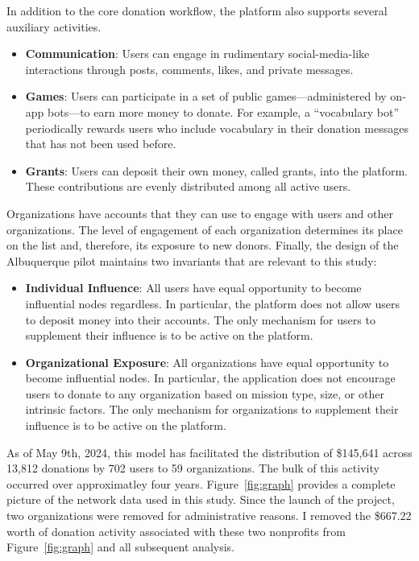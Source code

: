 In addition to the core donation workflow, the platform also supports several auxiliary activities. 

\begin{itemize}
  \item \textbf{Communication}: Users can engage in rudimentary social-media-like interactions through posts, comments, likes, and private messages.
  \item \textbf{Games}: Users can participate in a set of public games---administered by on-app bots---to earn more money to donate. For example, a ``vocabulary bot'' periodically rewards users who include vocabulary in their donation messages that has not been used before.
  \item \textbf{Grants}: Users can deposit their own money, called grants, into the platform. These contributions are evenly distributed among all active users.
\end{itemize}

Organizations have accounts that they can use to engage with users and other organizations.
The level of engagement of each organization determines its place on the list and, therefore, its exposure to new donors.
Finally, the design of the Albuquerque pilot maintains two invariants that are relevant to this study:

\begin{itemize}

  \item \textbf{Individual Influence}: All users have equal opportunity to become influential nodes regardless.
In particular, the platform does not allow users to deposit money into their accounts.
The only mechanism for users to supplement their influence is to be active on the platform.

  \item \textbf{Organizational Exposure}: All organizations have equal opportunity to become influential nodes.
In particular, the application does not encourage users to donate to any organization based on mission type, size, or other intrinsic factors.
The only mechanism for organizations to supplement their influence is to be active on the platform.

\end{itemize}

As of May 9th, 2024, this model has facilitated the distribution of \$145,641 across 13,812 donations by 702 users to 59 organizations.
The bulk of this activity occurred over approximatley four years.
Figure~\ref{fig:graph} provides a complete picture of the network data used in this study.
Since the launch of the project, two organizations were removed for administrative reasons.
I removed the \$667.22 worth of donation activity associated with these two nonprofits from Figure~\ref{fig:graph} and all subsequent analysis.

